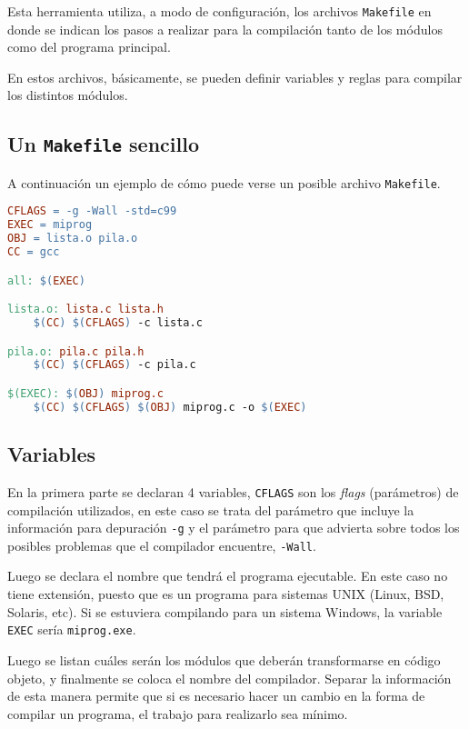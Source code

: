 Esta herramienta utiliza, a modo de configuración, los archivos
\verb!Makefile! en donde se indican los pasos a realizar para la compilación
tanto de los módulos como del programa principal.

En estos archivos, básicamente, se pueden definir variables y reglas para
compilar los distintos módulos.

\subsection{Un \texttt{Makefile} sencillo}

A continuación un ejemplo de cómo puede verse un posible archivo
\verb!Makefile!.

\begin{lstlisting}[language=make, numbers=none]
CFLAGS = -g -Wall -std=c99
EXEC = miprog
OBJ = lista.o pila.o
CC = gcc

all: $(EXEC)

lista.o: lista.c lista.h
	$(CC) $(CFLAGS) -c lista.c

pila.o: pila.c pila.h
	$(CC) $(CFLAGS) -c pila.c

$(EXEC): $(OBJ) miprog.c
	$(CC) $(CFLAGS) $(OBJ) miprog.c -o $(EXEC)
\end{lstlisting}

\subsection{Variables}

En la primera parte se declaran 4 variables, \lstinline!CFLAGS! son los
\textit{flags} (parámetros) de compilación utilizados, en este caso se trata
del parámetro que incluye la información para depuración \lstinline!-g! y el
parámetro para que advierta sobre todos los posibles problemas que el
compilador encuentre, \lstinline!-Wall!.

Luego se declara el nombre que tendrá el programa ejecutable.  En este caso no
tiene extensión, puesto que es un programa para sistemas UNIX (Linux, BSD,
Solaris, etc). Si se estuviera compilando para un sistema Windows, la variable
\lstinline!EXEC! sería \lstinline!miprog.exe!.

Luego se listan cuáles serán los módulos que deberán transformarse en código
objeto, y finalmente se coloca el nombre del compilador.  Separar la
información de esta manera permite que si es necesario hacer un cambio en la
forma de compilar un programa, el trabajo para realizarlo sea mínimo.

